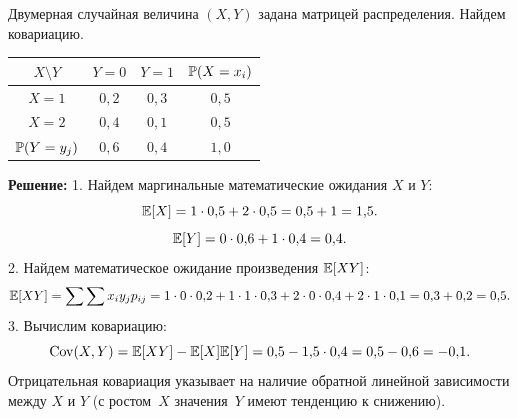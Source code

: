 \begin{example}
Двумерная случайная величина $(X,Y)$ задана матрицей распределения. Найдем ковариацию.
\begin{center}
\begin{tabular}{c|cc|c}
\toprule
$X \setminus Y$ & $Y=0$ & $Y=1$ & $\mathbb{P}(X=x_i)$ \\
\midrule
$X=1$ & $0{,}2$ & $0{,}3$ & $0{,}5$ \\
$X=2$ & $0{,}4$ & $0{,}1$ & $0{,}5$ \\
\midrule
$\mathbb{P}(Y=y_j)$ & $0{,}6$ & $0{,}4$ & $1{,}0$ \\
\bottomrule
\end{tabular}
\end{center}

\textbf{Решение:}
1. Найдем маргинальные математические ожидания $X$ и $Y$:
\[
\mathbb{E}[X] = 1 \cdot 0{,}5 + 2 \cdot 0{,}5 = 0{,}5 + 1 = 1{,}5.
\]
\[
\mathbb{E}[Y] = 0 \cdot 0{,}6 + 1 \cdot 0{,}4 = 0{,}4.
\]
2. Найдем математическое ожидание произведения $\mathbb{E}[XY]$:
\[
\mathbb{E}[XY] = \sum \sum x_i y_j p_{ij} = 1\cdot 0\cdot 0{,}2 + 1\cdot 1\cdot 0{,}3 + 2\cdot 0\cdot 0{,}4 + 2\cdot 1\cdot 0{,}1 = 0{,}3 + 0{,}2 = 0{,}5.
\]
3. Вычислим ковариацию:
\[
\operatorname{Cov}(X, Y) = \mathbb{E}[XY] - \mathbb{E}[X]\mathbb{E}[Y] = 0{,}5 - 1{,}5 \cdot 0{,}4 = 0{,}5 - 0{,}6 = -0{,}1.
\]
Отрицательная ковариация указывает на наличие обратной линейной зависимости между $X$ и $Y$ (с ростом~$X$ значения~$Y$ имеют тенденцию к снижению).
\end{example}